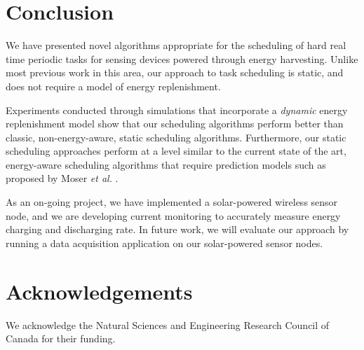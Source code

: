 \section{Conclusion} \label{sec:conclusion}

We have presented novel algorithms appropriate for the scheduling of hard real time periodic tasks 
for sensing devices powered through energy harvesting.  
Unlike most previous work in this area, our approach to task scheduling is static, 
and does not require a model of energy replenishment. 

Experiments conducted through simulations that incorporate a \emph{dynamic} energy replenishment model 
show that our scheduling algorithms perform better than classic, 
non-energy-aware, static scheduling algorithms. 
Furthermore, our static scheduling approaches perform at a level similar to the current state of the art, 
energy-aware scheduling algorithms that require prediction models such as proposed by Moser \emph{et al.} \cite{moser2007real}.  

As an on-going project, we have implemented a solar-powered wireless sensor node, and we are developing current monitoring to accurately measure energy charging and discharging rate. In future work, we will evaluate our approach by running a data acquisition application on our solar-powered sensor nodes. 

\section*{Acknowledgements}

We acknowledge the Natural Sciences and Engineering Research Council of Canada for their funding. 


